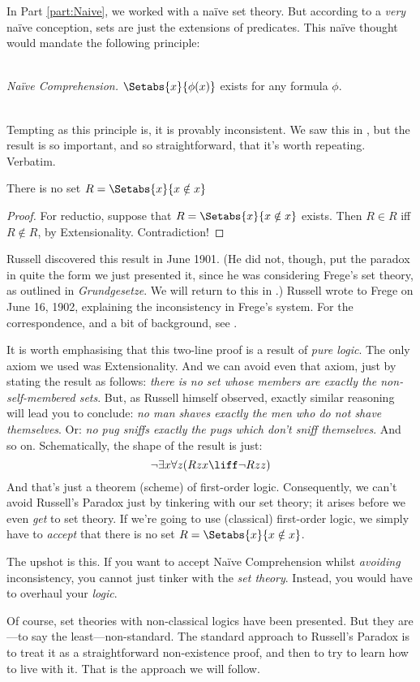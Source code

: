 \documentclass[../../../include/open-logic-section]{subfiles}
\begin{document}

In Part \ref{part:Naive}, we worked with a na\"{i}ve set theory. But according to a \emph{very} na\"{i}ve conception, sets are just the extensions of predicates. This na\"ive thought would mandate the following principle:

\
\\\emph{Na\"{i}ve Comprehension.} $\Setabs{x}{\phi(x)}$ exists for any formula $\phi$.

\
\\Tempting as this principle is, it is provably inconsistent. We saw this in , but the result is so important, and so straightforward, that it's worth repeating. Verbatim.
\begin{thm}[Russell's Paradox]
	There is no set $R = \Setabs{x}{x \notin x}$
\end{thm}
\begin{proof}
	For reductio, suppose that $R = \Setabs{x}{x \notin x}$ exists. Then $R \in R$ iff $R \notin R$, by Extensionality. Contradiction!
\end{proof}\noindent
Russell discovered this result in June 1901. (He did not, though, put the paradox in quite the form we just presented it, since he was considering Frege's set theory, as outlined in \emph{Grundgesetze}. We will return to this in .) Russell wrote to Frege on June 16, 1902, explaining the inconsistency in Frege's system. For the correspondence, and a bit of background, see \citet[124--8]{Heijenoort1967}. 

It is worth emphasising that this two-line proof is a result of \emph{pure logic}. The only axiom we used was Extensionality. And we can avoid even {that} axiom, just by stating the result as follows: \emph{there is no set whose members are exactly the non-self-membered sets}. But, as Russell himself observed, exactly similar reasoning will lead you to conclude: \emph{no man shaves exactly the men who do not shave themselves}. Or: \emph{no pug sniffs exactly the pugs which don't sniff themselves}. And so on. Schematically, the shape of the result is just: 
$$\lnot \exists x \forall z(Rzx \liff \lnot R zz)$$ 
And that's just a theorem (scheme) of first-order logic. Consequently, we can't avoid Russell's Paradox just by tinkering with our set theory; it arises before we even \emph{get} to set theory. If we're going to use (classical) first-order logic, we simply have to \emph{accept} that there is no set $R = \Setabs{x}{x\notin x}$. 

The upshot is this. If you want to accept Na\"{i}ve Comprehension whilst \emph{avoiding} inconsistency, you cannot just tinker with the \emph{set theory}. Instead, you would have to overhaul your \emph{logic}.

Of course, set theories with non-classical logics have been presented. But they are---to say the least---non-standard. The standard approach to Russell's Paradox is to treat it as a straightforward non-existence proof, and then to try to learn how to live with it. That is the approach we will follow.
\end{document}
